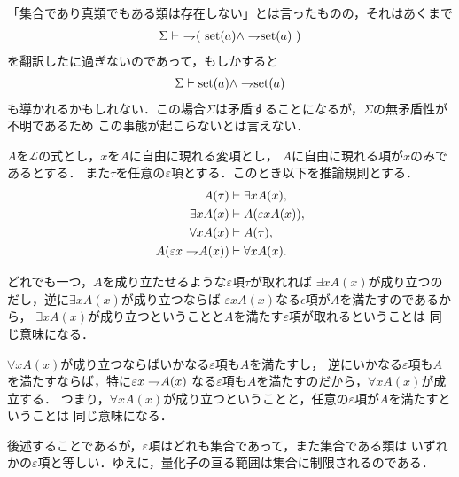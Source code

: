 	「集合であり真類でもある類は存在しない」とは言ったものの，それはあくまで
	\begin{align}
		\Sigma \vdash\ \rightharpoondown\hspace{-0.25em} (\ \operatorname*{set} (a) \wedge \rightharpoondown\hspace{-0.25em} \operatorname*{set} (a)\ )
	\end{align}
	を翻訳したに過ぎないのであって，もしかすると
	\begin{align}
		\Sigma \vdash \operatorname*{set} (a) \wedge \rightharpoondown\hspace{-0.25em} \operatorname*{set} (a)
	\end{align}
	も導かれるかもしれない．この場合$\Sigma$は矛盾することになるが，$\Sigma$の無矛盾性が不明であるため
	この事態が起こらないとは言えない．
	
	\begin{screen}
		\begin{logicalaxm}[量化記号に関する規則]\label{logicalaxm:rules_of_quantifiers}
			$A$を$\mathcal{L}$の式とし，$x$を$A$に自由に現れる変項とし，
			$A$に自由に現れる項が$x$のみであるとする．
			また$\tau$を任意の$\varepsilon$項とする．このとき以下を推論規則とする．
			\begin{align}
				A(\tau) &\vdash \exists x A(x), \\
				\exists x A(x) &\vdash A(\varepsilon x A(x)), \\
				\forall x A(x) &\vdash A(\tau), \\
				A(\varepsilon x \rightharpoondown\hspace{-0.25em} A(x)) &\vdash \forall x A(x).
			\end{align}
		\end{logicalaxm}
	\end{screen}
	
	どれでも一つ，$A$を成り立たせるような$\varepsilon$項$\tau$が取れれば
	$\exists x A(x)$が成り立つのだし，逆に$\exists x A(x)$が成り立つならば
	$\varepsilon x A(x)$なる$\epsilon$項が$A$を満たすのであるから，
	$\exists x A(x)$が成り立つということと$A$を満たす$\varepsilon$項が取れるということは
	同じ意味になる．
	
	$\forall x A(x)$が成り立つならばいかなる$\varepsilon$項も$A$を満たすし，
	逆にいかなる$\varepsilon$項も$A$を満たすならば，特に$\varepsilon x \rightharpoondown\hspace{-0.25em} A(x)$
	なる$\varepsilon$項も$A$を満たすのだから，$\forall x A(x)$が成立する．
	つまり，$\forall x A(x)$が成り立つということと，任意の$\varepsilon$項が$A$を満たすということは
	同じ意味になる．
	
	後述することであるが，$\varepsilon$項はどれも集合であって，また集合である類は
	いずれかの$\varepsilon$項と等しい．ゆえに，量化子の亘る範囲は集合に制限されるのである．
	
